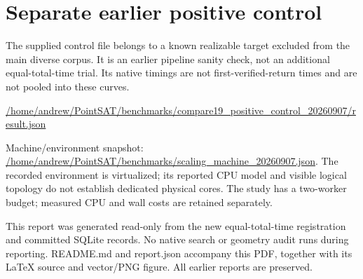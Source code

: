 \documentclass[10pt,a4paper]{article}
\begin{document}
\section*{Separate earlier positive control}

The supplied control file belongs to a known realizable target excluded from the main diverse corpus. It is an earlier pipeline sanity check, not an additional equal-total-time trial. Its native timings are not first-verified-return times and are not pooled into these curves.

{\small\url{/home/andrew/PointSAT/benchmarks/compare19_positive_control_20260907/result.json}}

Machine/environment snapshot: {\small\url{/home/andrew/PointSAT/benchmarks/scaling_machine_20260907.json}}. The recorded environment is virtualized; its reported CPU model and visible logical topology do not establish dedicated physical cores. The study has a two-worker budget; measured CPU and wall costs are retained separately.

This report was generated read-only from the new equal-total-time registration and committed SQLite records. No native search or geometry audit runs during reporting. README.md and report.json accompany this PDF, together with its LaTeX source and vector/PNG figure. All earlier reports are preserved.
\end{document}
